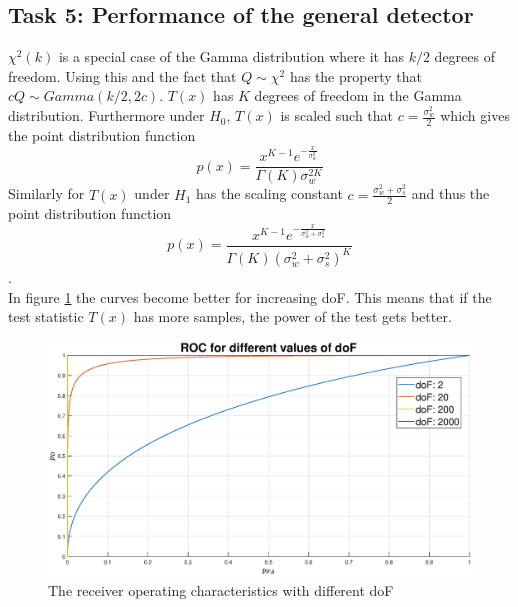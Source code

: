 \subsection{Task 5: Performance of the general detector}
$\chi^2(k)$ is a special case of the Gamma distribution where it has $k/2$ degrees of freedom. Using this and the fact that $Q\sim\chi^2$ has the property that $cQ\sim Gamma(k/2, 2c)$. $T(x)$ has $K$ degrees of freedom in the Gamma distribution. Furthermore under $H_0$, $T(x)$ is scaled such that $c = \frac{\sigma_w^2}{2}$ which gives the point distribution function
\begin{equation}
    p(x) = \frac{x^{K-1}e^{-\frac{x}{\sigma_w^2}}}{\Gamma(K)\sigma_w^{2K}}
\end{equation}
Similarly for $T(x)$ under $H_1$ has the scaling constant $c = \frac{\sigma_w^2+\sigma_s^2}{2}$ and thus the point distribution function
\begin{equation}
    p(x) = \frac{x^{K-1}e^{-\frac{x}{\sigma_w^2+\sigma_s^2}}}{\Gamma(K)(\sigma_w^{2}+\sigma_s^2)^K}
\end{equation}.\\
In figure \ref{fig:roc} the curves become better for increasing doF. This means that if the test statistic $T(x)$ has more samples, the power of the test gets better.
\begin{figure}
    \centering
    \includegraphics[width=\textwidth]{figures/roc2.eps}
    \caption{The receiver operating characteristics with different doF}
    \label{fig:roc}
\end{figure}

